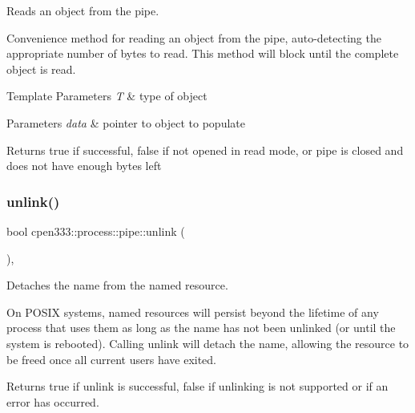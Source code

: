 Reads an object from the pipe. 

Convenience method for reading an object from the pipe, auto-\/detecting the appropriate number of bytes to read. This method will block until the complete object is read.


\begin{DoxyTemplParams}{Template Parameters}
{\em T} & type of object \\
\hline
\end{DoxyTemplParams}

\begin{DoxyParams}{Parameters}
{\em data} & pointer to object to populate \\
\hline
\end{DoxyParams}
\begin{DoxyReturn}{Returns}
true if successful, false if not opened in read mode, or pipe is closed and does not have enough bytes left 
\end{DoxyReturn}
\mbox{\label{classcpen333_1_1process_1_1pipe_addcc650694ad0712637874eb79ec8407}} 
\subsubsection{\texorpdfstring{unlink()}{unlink()}\hspace{0.1cm}{\footnotesize\ttfamily [1/2]}}
{\footnotesize\ttfamily bool cpen333\+::process\+::pipe\+::unlink (\begin{DoxyParamCaption}{ }\end{DoxyParamCaption})\hspace{0.3cm}{\ttfamily [inline]}, {\ttfamily [virtual]}}



Detaches the name from the named resource. 

On P\+O\+S\+IX systems, named resources will persist beyond the lifetime of any process that uses them as long as the name has not been unlinked (or until the system is rebooted). Calling {\ttfamily unlink} will detach the name, allowing the resource to be freed once all current users have exited.

\begin{DoxyReturn}{Returns}
{\ttfamily true} if unlink is successful, {\ttfamily false} if unlinking is not supported or if an error has occurred. 
\end{DoxyReturn}



